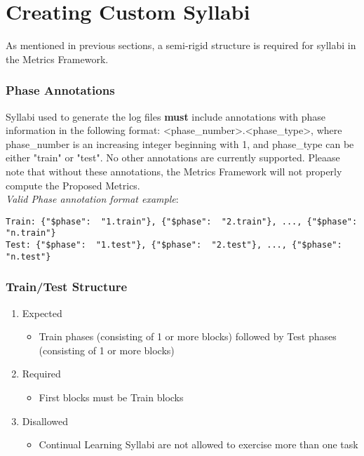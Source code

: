 \chapter{Creating Custom Syllabi}\label{ch:custom_syllabi}

As mentioned in previous sections, a semi-rigid structure is required for syllabi in the Metrics Framework. 

\subsection*{Phase Annotations}

Syllabi used to generate the log files \textbf{must} include annotations with phase information in the following format: <phase\_number>.<phase\_type>, where phase\_number is an increasing integer beginning with 1, and phase\_type can be either "train" or "test". No other annotations are currently supported. Pleaase note that without these annotations, the Metrics Framework will not properly compute the Proposed Metrics. \\[0.1in]


\textit{Valid Phase annotation format example}:\\[0.1in]
\begin{small}
\begin{verbatim}
Train: {"$phase":  "1.train"}, {"$phase":  "2.train"}, ..., {"$phase":  "n.train"}
Test: {"$phase":  "1.test"}, {"$phase":  "2.test"}, ..., {"$phase":  "n.test"}
\end{verbatim}
\end{small}

\subsection*{Train/Test Structure}

\begin{enumerate}
\item Expected
\begin{itemize}
\item Train phases (consisting of 1 or more blocks) followed by Test phases (consisting of 1 or more blocks)
\end{itemize}

\item Required
\begin{itemize}
\item First blocks must be Train blocks
\end{itemize}

\item Disallowed
\begin{itemize}
\item Continual Learning Syllabi are not allowed to exercise more than one task
\end{itemize}
\end{enumerate}

